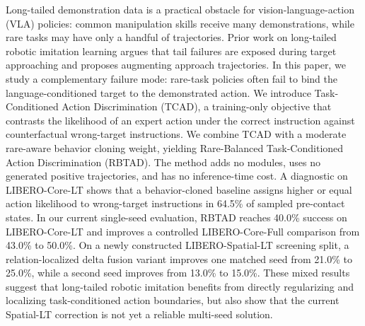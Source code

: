 Long-tailed demonstration data is a practical obstacle for vision-language-action (VLA) policies: common manipulation skills receive many demonstrations, while rare tasks may have only a handful of trajectories. Prior work on long-tailed robotic imitation learning argues that tail failures are exposed during target approaching and proposes augmenting approach trajectories. In this paper, we study a complementary failure mode: rare-task policies often fail to bind the language-conditioned target to the demonstrated action. We introduce Task-Conditioned Action Discrimination (TCAD), a training-only objective that contrasts the likelihood of an expert action under the correct instruction against counterfactual wrong-target instructions. We combine TCAD with a moderate rare-aware behavior cloning weight, yielding Rare-Balanced Task-Conditioned Action Discrimination (RBTAD). The method adds no modules, uses no generated positive trajectories, and has no inference-time cost. A diagnostic on LIBERO-Core-LT shows that a behavior-cloned baseline assigns higher or equal action likelihood to wrong-target instructions in 64.5\% of sampled pre-contact states. In our current single-seed evaluation, RBTAD reaches 40.0\% success on LIBERO-Core-LT and improves a controlled LIBERO-Core-Full comparison from 43.0\% to 50.0\%. On a newly constructed LIBERO-Spatial-LT screening split, a relation-localized delta fusion variant improves one matched seed from 21.0\% to 25.0\%, while a second seed improves from 13.0\% to 15.0\%. These mixed results suggest that long-tailed robotic imitation benefits from directly regularizing and localizing task-conditioned action boundaries, but also show that the current Spatial-LT correction is not yet a reliable multi-seed solution.

